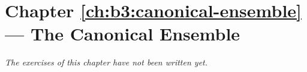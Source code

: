 \section*{Chapter \ref{ch:b3:canonical-ensemble} --- The Canonical Ensemble}


\emph{The exercises of this chapter have not been written yet.}
